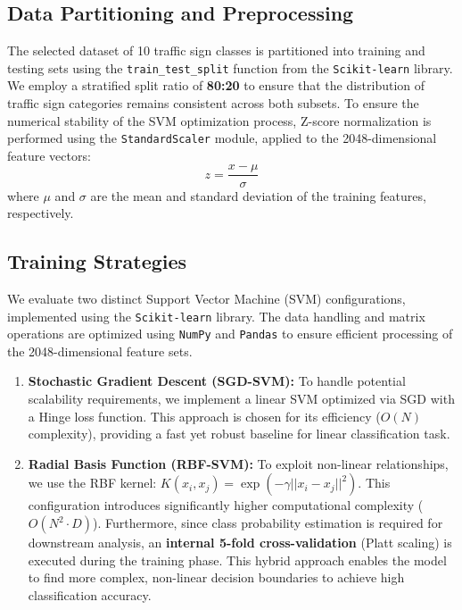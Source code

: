 \subsection{Data Partitioning and Preprocessing}
The selected dataset of 10 traffic sign classes is partitioned into training and testing sets using the \texttt{train\_test\_split} function from the \texttt{Scikit-learn} library. We employ a stratified split ratio of \textbf{80:20} to ensure that the distribution of traffic sign categories remains consistent across both subsets. To ensure the numerical stability of the SVM optimization process, Z-score normalization is performed using the \texttt{StandardScaler} module, applied to the 2048-dimensional feature vectors:
\begin{equation}
    z = \frac{x - \mu}{\sigma}
\end{equation}
where $\mu$ and $\sigma$ are the mean and standard deviation of the training features, respectively.

\subsection{Training Strategies}
We evaluate two distinct Support Vector Machine (SVM) configurations, implemented using the \texttt{Scikit-learn} library. The data handling and matrix operations are optimized using \texttt{NumPy} and \texttt{Pandas} to ensure efficient processing of the 2048-dimensional feature sets.

\begin{enumerate}
    \item \textbf{Stochastic Gradient Descent (SGD-SVM):} To handle potential scalability requirements, we implement a linear SVM optimized via SGD with a Hinge loss function. This approach is chosen for its efficiency ($O(N)$ complexity), providing a fast yet robust baseline for linear classification task.
    \item \textbf{Radial Basis Function (RBF-SVM):} To exploit non-linear relationships, we use the RBF kernel: $K(x_i, x_j) = \exp(-\gamma ||x_i - x_j||^2)$. This configuration introduces significantly higher computational complexity ($O(N^2 \cdot D)$). Furthermore, since class probability estimation is required for downstream analysis, an \textbf{internal 5-fold cross-validation} (Platt scaling) is executed during the training phase. This hybrid approach enables the model to find more complex, non-linear decision boundaries to achieve high classification accuracy.
\end{enumerate}

